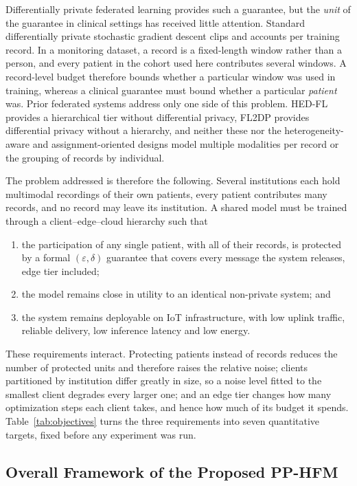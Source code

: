 Differentially private federated learning provides such a guarantee, but the
\emph{unit} of the guarantee in clinical settings has received little
attention. Standard differentially private stochastic gradient descent
\cite{ref6} clips and accounts per training record. In a monitoring dataset, a
record is a fixed-length window rather than a person, and every patient in the
cohort used here contributes several windows. A record-level budget therefore
bounds whether a particular window was used in training, whereas a clinical
guarantee must bound whether a particular \emph{patient} was. Prior federated
systems address only one side of this problem. HED-FL \cite{ref3} provides a
hierarchical tier without differential privacy, FL2DP \cite{ref9} provides
differential privacy without a hierarchy, and neither these nor the
heterogeneity-aware and assignment-oriented designs \cite{ref4, ref5} model
multiple modalities per record or the grouping of records by individual.

The problem addressed is therefore the following. Several institutions each
hold multimodal recordings of their own patients, every patient contributes
many records, and no record may leave its institution. A shared model must be
trained through a client--edge--cloud hierarchy such that
\begin{enumerate}
\item the participation of any single patient, with all of their records, is
protected by a formal $(\varepsilon,\delta)$ guarantee that covers every
message the system releases, edge tier included;
\item the model remains close in utility to an identical non-private system;
and
\item the system remains deployable on IoT infrastructure, with low uplink
traffic, reliable delivery, low inference latency and low energy.
\end{enumerate}
These requirements interact. Protecting patients instead of records reduces
the number of protected units and therefore raises the relative noise;
clients partitioned by institution differ greatly in size, so a noise level
fitted to the smallest client degrades every larger one; and an edge tier
changes how many optimization steps each client takes, and hence how much of
its budget it spends. Table~\ref{tab:objectives} turns the three requirements
into seven quantitative targets, fixed before any experiment was run.

\subsection{Overall Framework of the Proposed PP-HFM}
\label{sec:method:overview}

